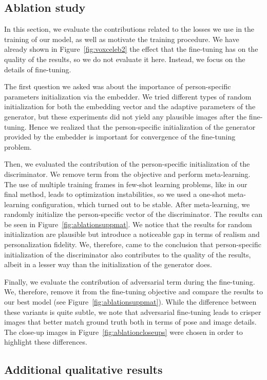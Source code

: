\documentclass[10pt,twocolumn,letterpaper]{article}
\newcommand{\fig}[1]{Figure~\ref{fig:#1}}
\begin{document}
\subsection{Ablation study}

In this section, we evaluate the contributions related to the losses we use in the training of our model, as well as motivate the training procedure. We have already shown in \fig{voxceleb2} the effect that the fine-tuning has on the quality of the results, so we do not evaluate it here. Instead, we focus on the details of fine-tuning. 

The first question we asked was about the importance of person-specific parameters initialization via the embedder. We tried different types of random initialization for both the embedding vector  and the adaptive parameters  of the generator, but these experiments did not yield any plausible images after the fine-tuning. Hence we realized that the person-specific initialization of the generator provided by the embedder is important for convergence of the fine-tuning problem.

Then, we evaluated the contribution of the person-specific initialization of the discriminator. We remove  term from the objective and perform meta-learning. The use of multiple training frames in few-shot learning problems, like in our final method, leads to optimization instabilities, so we used a one-shot meta-learning configuration, which turned out to be stable. After meta-learning, we randomly initialize the person-specific vector  of the discriminator. The results can be seen in \fig{ablationsuppmat}. We notice that the results for random initialization are plausible but introduce a noticeable gap in terms of realism and personalization fidelity. We, therefore, came to the conclusion that person-specific initialization of the discriminator also contributes to the quality of the results, albeit in a lesser way than the initialization of the generator does.

Finally, we evaluate the contribution of adversarial term  during the fine-tuning. We, therefore, remove it from the fine-tuning objective and compare the results to our best model (see \fig{ablationsuppmat}). While the difference between these variants is quite subtle, we note that adversarial fine-tuning leads to crisper images that better match ground truth both in terms of pose and image details. The close-up images in \fig{ablationcloseups} were chosen in order to highlight these differences.

\subsection{Additional qualitative results}
\end{document}
